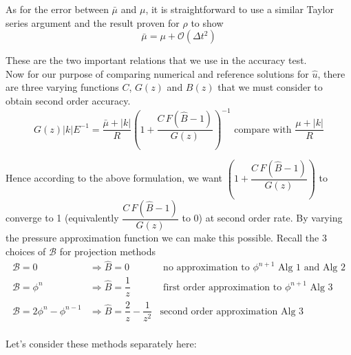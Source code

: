 As for the error between $\bar{\mu}$ and $\mu$, it is straightforward to use a similar Taylor series argument and the result proven for $\rho$ to show 
\begin{equation}\label{eq:error for mu}
\bar{\mu} = \mu + \mathcal{O}(\Delta t^2)
\end{equation}

These are the two important relations that we use in the accuracy test.\\

Now for our purpose of comparing numerical and reference solutions for $\hat{u}$, there are three varying functions $C$, $G(z)$ and $B(z)$ that we must consider to obtain second order accuracy.
\begin{equation*}
G(z) |k|E^{-1} = \dfrac{\bar{\mu} + |k|}{R}(1 + \dfrac{C \, F(\hat{B} - 1)}{G(z)})^{-1} \text{ compare with } \dfrac{\mu + |k|}{R} 
\end{equation*}

Hence according to the above formulation, we want $(1 + \dfrac{C \, F(\hat{B} - 1)}{G(z)})$ to converge to 1 (equivalently $\dfrac{C \, F(\hat{B} - 1)}{G(z)}$ to 0) at second order rate. By varying the pressure approximation function we can make this possible. Recall the 3 choices of $\mathcal{B}$ for projection methods
\begin{equation}
\begin{array}{lccl}
\mathcal{B} = 0 & \Rightarrow \hat{B}=0 & \text{   no approximation to $\phi^{n+1}$   Alg 1 and Alg 2}\\

\mathcal{B} = \phi^n & \Rightarrow \hat{B} = \dfrac{1}{z} & \text{   first order approximation to $\phi^{n+1}$  Alg 3}\\

\mathcal{B} = 2\phi^n - \phi^{n-1} & \Rightarrow \hat{B} = \dfrac{2}{z} - \dfrac{1}{z^2} &\text{second order approximation  Alg 3}\\
\end{array}
\end{equation}

Let's consider these methods separately here:\\

